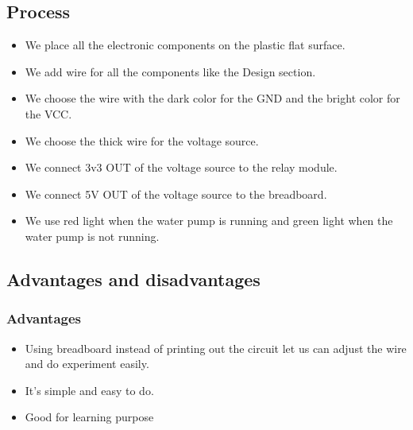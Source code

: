 \documentclass[12pt]{article}
\begin{document}
        \subsection{Process}
        \begin{itemize}
            \item We place all the electronic components on the plastic flat surface. 
            \item We add wire for all the components like the Design section. 
            \item We choose the wire with the dark color for the GND and the bright color for the VCC.
            \item We choose the thick wire for the voltage source.
            \item We connect 3v3 OUT of the voltage source to the relay module.
            \item We connect 5V OUT of the voltage source to the breadboard.
            \item We use red light when the water pump is running and green light when the water pump is not running.
        \end{itemize}
        \subsection{Advantages and disadvantages}
        \subsubsection{Advantages}
            \begin{itemize}
                \item Using breadboard instead of printing out the circuit let us can adjust the wire and do experiment easily.
                \item It's simple and easy to do.
                \item Good for learning purpose
            \end{itemize}
\end{document}
